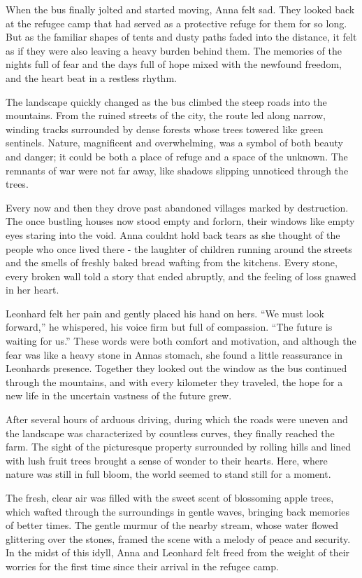 \documentclass[
]{article}
\begin{document}
When the bus finally jolted and started moving, Anna felt sad. They
looked back at the refugee camp that had served as a protective refuge
for them for so long. But as the familiar shapes of tents and dusty
paths faded into the distance, it felt as if they were also leaving a
heavy burden behind them. The memories of the nights full of fear and
the days full of hope mixed with the newfound freedom, and the heart
beat in a restless rhythm.

The landscape quickly changed as the bus climbed the steep roads into
the mountains. From the ruined streets of the city, the route led along
narrow, winding tracks surrounded by dense forests whose trees towered
like green sentinels. Nature, magnificent and overwhelming, was a symbol
of both beauty and danger; it could be both a place of refuge and a
space of the unknown. The remnants of war were not far away, like
shadows slipping unnoticed through the trees.

Every now and then they drove past abandoned villages marked by
destruction. The once bustling houses now stood empty and forlorn, their
windows like empty eyes staring into the void. Anna
couldn\textquotesingle t hold back tears as she thought of the people
who once lived there - the laughter of children running around the
streets and the smells of freshly baked bread wafting from the kitchens.
Every stone, every broken wall told a story that ended abruptly, and the
feeling of loss gnawed in her heart.

Leonhard felt her pain and gently placed his hand on hers. ``We must
look forward,'' he whispered, his voice firm but full of compassion.
``The future is waiting for us.'' These words were both comfort and
motivation, and although the fear was like a heavy stone in
Anna\textquotesingle s stomach, she found a little reassurance in
Leonhard\textquotesingle s presence. Together they looked out the window
as the bus continued through the mountains, and with every kilometer
they traveled, the hope for a new life in the uncertain vastness of the
future grew.

After several hours of arduous driving, during which the roads were
uneven and the landscape was characterized by countless curves, they
finally reached the farm. The sight of the picturesque property
surrounded by rolling hills and lined with lush fruit trees brought a
sense of wonder to their hearts. Here, where nature was still in full
bloom, the world seemed to stand still for a moment.

The fresh, clear air was filled with the sweet scent of blossoming apple
trees, which wafted through the surroundings in gentle waves, bringing
back memories of better times. The gentle murmur of the nearby stream,
whose water flowed glittering over the stones, framed the scene with a
melody of peace and security. In the midst of this idyll, Anna and
Leonhard felt freed from the weight of their worries for the first time
since their arrival in the refugee camp.
\end{document}
